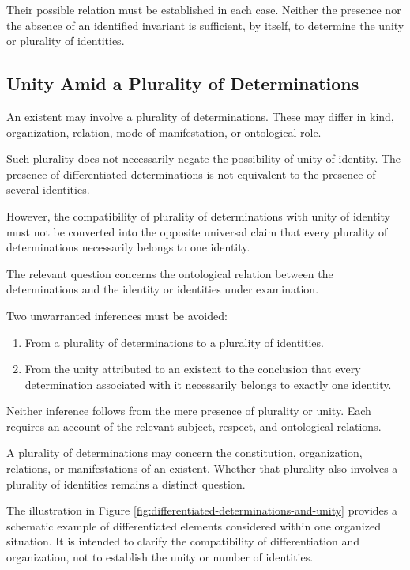 Their possible relation must be established in
each case. Neither the presence nor the absence
of an identified invariant is sufficient, by itself,
to determine the unity or plurality of identities.

\subsection{Unity Amid a Plurality of Determinations}

An existent may involve a plurality of determinations.
These may differ in kind, organization, relation,
mode of manifestation, or ontological role.

Such plurality does not necessarily negate the
possibility of unity of identity. The presence
of differentiated determinations is not equivalent
to the presence of several identities.

However, the compatibility of plurality of
determinations with unity of identity must not
be converted into the opposite universal claim
that every plurality of determinations necessarily
belongs to one identity.

The relevant question concerns the ontological
relation between the determinations and the
identity or identities under examination.

Two unwarranted inferences must be avoided:

\begin{enumerate}
    \item From a plurality of determinations to
    a plurality of identities.

    \item From the unity attributed to an existent
    to the conclusion that every determination
    associated with it necessarily belongs to
    exactly one identity.
\end{enumerate}

Neither inference follows from the mere presence
of plurality or unity. Each requires an account
of the relevant subject, respect, and ontological
relations.

A plurality of determinations may concern the
constitution, organization, relations, or
manifestations of an existent. Whether that
plurality also involves a plurality of identities
remains a distinct question.

The illustration in Figure
\ref{fig:differentiated-determinations-and-unity}
provides a schematic example of differentiated
elements considered within one organized situation.
It is intended to clarify the compatibility
of differentiation and organization, not to
establish the unity or number of identities.

